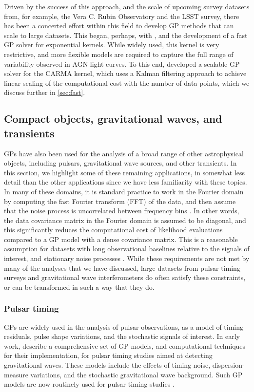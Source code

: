 \documentclass[letterpaper]{ar-1col}
\begin{document}
Driven by the success of this approach, and the scale of upcoming survey datasets from, for example, the Vera C. Rubin Observatory and the LSST survey, there has been a concerted effort within this field to develop GP methods that can scale to large datasets.
This began, perhaps, with \citet{pr95}, and the development of a fast GP solver for exponential kernels.
While widely used, this kernel is very restrictive, and more flexible models are required to capture the full range of variability observed in AGN light curves.
To this end, \citet{2014ApJ...788...33K} developed a scalable GP solver for the CARMA kernel, which uses a Kalman filtering approach to achieve linear scaling of the computational cost with the number of data points, which we discuss further in \autoref{sec:fast}.

\subsection{Compact objects, gravitational waves, and transients}

GPs have also been used for the analysis of a broad range of other astrophysical objects, including pulsars, gravitational wave sources, and other transients.
In this section, we highlight some of these remaining applications, in somewhat less detail than the other applications since we have less familiarity with these topics.
In many of these domains, it is standard practice to work in the Fourier domain by computing the fast Fourier transform (FFT) of the data, and then assume that the noise process is uncorrelated between frequency bins \citep[e.g.,][]{2017LRR....20....2R}.
In other words, the data covariance matrix in the Fourier domain is assumed to be diagonal, and this significantly reduces the computational cost of likelihood evaluations compared to a GP model with a dense covariance matrix.
This is a reasonable assumption for datasets with long observational baselines relative to the signals of interest, and stationary noise processes \citep[e.g.,][]{UNSER1984231}.
While these requirements are not met by many of the analyses that we have discussed, large datasets from pulsar timing surveys and gravitational wave interferometers do often satisfy these constraints, or can be transformed in such a way that they do.

\subsubsection{Pulsar timing} GPs are widely used in the analysis of pulsar observations, as a model of timing residuals, pulse shape variations, and the stochastic signals of interest.
In early work, \citet{2014PhRvD..90j4012V} describe a comprehensive set of GP models, and computational techniques for their implementation, for pulsar timing studies aimed at detecting gravitational waves.
These models include the effects of timing noise, dispersion-measure variations, and the stochastic gravitational wave background.
Such GP models are now routinely used for pulsar timing studies \citep[e.g.][]{2019MNRAS.489.3810P, 2020MNRAS.498.6044C, 2022MNRAS.510.4873A}.
\end{document}
